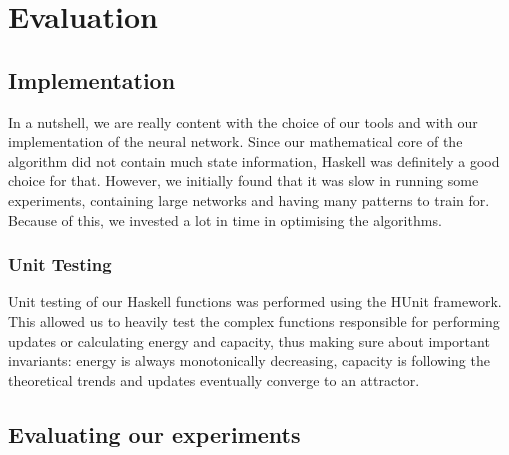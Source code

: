 \chapter{Evaluation}




\section{Implementation}

In a nutshell, we are really content with the choice of our tools and with our implementation of the neural network. Since our mathematical core of the algorithm did not contain much state information, Haskell was definitely a good choice for that. However, we initially found that it was slow in running some experiments, containing large networks and having many patterns to train for. Because of this, we invested a lot in time in optimising the algorithms. 

\subsection{Unit Testing}

Unit testing of our Haskell functions was performed using the HUnit framework. This allowed us to heavily test the complex functions responsible for performing updates or calculating energy and capacity, thus making sure about important invariants: energy is always monotonically decreasing, capacity is following the theoretical trends and updates eventually converge to an attractor. 


\section{Evaluating our experiments}

